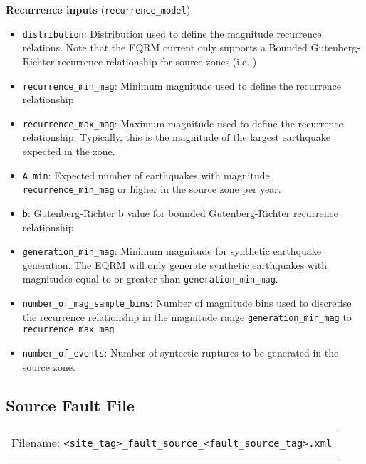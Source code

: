 \textbf{Recurrence inputs} (\texttt{recurrence\_model})
\begin{itemize}
\item \texttt{distribution}: Distribution used to define the magnitude recurrence relations. Note that
the EQRM current only supports a Bounded Gutenberg-Richter recurrence
relationship for source zones (i.e.
) 
\item \texttt{recurrence\_min\_mag}: Minimum magnitude used to
define the recurrence relationship 
\item \texttt{recurrence\_max\_mag}: Maximum magnitude used to
define the recurrence relationship. Typically, this is the magnitude
of the largest earthquake expected in the zone. 
\item \texttt{A\_min}: Expected number of earthquakes with magnitude \texttt{recurrence\_min\_mag}
or higher in the source zone per year.
\item \texttt{b}: Gutenberg-Richter b value for bounded Gutenberg-Richter recurrence
relationship 
\item \texttt{generation\_min\_mag}: Minimum magnitude for synthetic
earthquake generation. The EQRM will only generate synthetic
earthquakes with magnitudes equal to or greater than
\texttt{generation\_min\_mag}. 
\item \texttt{number\_of\_mag\_sample\_bins}: Number of magnitude
bins used to discretise the recurrence relationship in the magnitude
range \texttt{generation\_min\_mag} to
\texttt{recurrence\_max\_mag} 
\item \texttt{number\_of\_events}: Number of syntectic ruptures to
be generated in the source zone.
\end{itemize}

\subsection{Source Fault File}

\begin{center}
\begin{tabular}{|c|}
\hline
\\
Filename: \texttt{<site\_tag>\_}\texttt{fault\_source\_}\texttt{<fault\_source\_tag>}\texttt{.xml}\\
\\
\hline
\end{tabular} 
\end{center}

